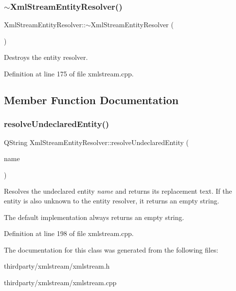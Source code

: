\subsubsection{\texorpdfstring{$\sim$\+Xml\+Stream\+Entity\+Resolver()}{~XmlStreamEntityResolver()}}
{\footnotesize\ttfamily Xml\+Stream\+Entity\+Resolver\+::$\sim$\+Xml\+Stream\+Entity\+Resolver (\begin{DoxyParamCaption}{ }\end{DoxyParamCaption})\hspace{0.3cm}{\ttfamily [virtual]}}

Destroys the entity resolver. 

Definition at line 175 of file xmlstream.\+cpp.



\subsection{Member Function Documentation}
\mbox{\label{class_xml_stream_entity_resolver_adb9a96c9174d809d5f4842fc52829f2c}} 
\subsubsection{\texorpdfstring{resolve\+Undeclared\+Entity()}{resolveUndeclaredEntity()}}
{\footnotesize\ttfamily Q\+String Xml\+Stream\+Entity\+Resolver\+::resolve\+Undeclared\+Entity (\begin{DoxyParamCaption}\item[{const Q\+String \&}]{name }\end{DoxyParamCaption})\hspace{0.3cm}{\ttfamily [virtual]}}

Resolves the undeclared entity {\itshape name} and returns its replacement text. If the entity is also unknown to the entity resolver, it returns an empty string.

The default implementation always returns an empty string. 

Definition at line 198 of file xmlstream.\+cpp.



The documentation for this class was generated from the following files\+:\begin{DoxyCompactItemize}
\item 
thirdparty/xmlstream/xmlstream.\+h\item 
thirdparty/xmlstream/xmlstream.\+cpp\end{DoxyCompactItemize}

